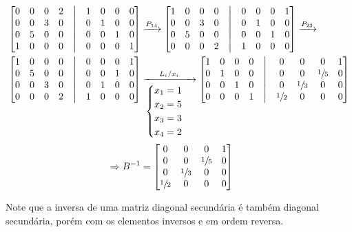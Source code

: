 \documentclass[leqno]{article}
\begin{document}
\begin{enumerate}
    \begin{align*}
        \begin{bmatrix}
        0 & 0 & 0 & 2 & \bigm| & 1 & 0 & 0 & 0\\
        0 & 0 & 3 & 0 & \bigm| & 0 & 1 & 0 & 0\\
        0 & 5 & 0 & 0 & \bigm| & 0 & 0 & 1 & 0\\
        1 & 0 & 0 & 0 & \bigm| & 0 & 0 & 0 & 1\\
        \end{bmatrix}&\xrightarrow{P_{14}}\begin{bmatrix}
        1 & 0 & 0 & 0 & \bigm| & 0 & 0 & 0 & 1\\
        0 & 0 & 3 & 0 & \bigm| & 0 & 1 & 0 & 0\\
        0 & 5 & 0 & 0 & \bigm| & 0 & 0 & 1 & 0\\
        0 & 0 & 0 & 2 & \bigm| & 1 & 0 & 0 & 0\\
        \end{bmatrix}\xrightarrow{P_{23}}\\
        \begin{bmatrix}
        1 & 0 & 0 & 0 & \bigm| & 0 & 0 & 0 & 1\\
        0 & 5 & 0 & 0 & \bigm| & 0 & 0 & 1 & 0\\
        0 & 0 & 3 & 0 & \bigm| & 0 & 1 & 0 & 0\\
        0 & 0 & 0 & 2 & \bigm| & 1 & 0 & 0 & 0\\
        \end{bmatrix}&\xrightarrow[\begin{cases}x_1=1\\x_2=5\\x_3=3\\x_4=2\\\end{cases} ]{L_i/x_i}\begin{bmatrix}
        1 & 0 & 0 & 0 & \bigm| & 0 & 0 & 0 & 1\\
        0 & 1 & 0 & 0 & \bigm| & 0 & 0 & \sfrac{1}{5} & 0\\
        0 & 0 & 1 & 0 & \bigm| & 0 & \sfrac{1}{3} & 0 & 0\\
        0 & 0 & 0 & 1 & \bigm| & \sfrac{1}{2} & 0 & 0 & 0\\
        \end{bmatrix}\\
        \Rightarrow B^{-1}&=\begin{bmatrix}
        0 & 0 & 0 & 1\\
        0 & 0 & \sfrac{1}{5} & 0\\
        0 & \sfrac{1}{3} & 0 & 0\\
        \sfrac{1}{2} & 0 & 0 & 0\\
        \end{bmatrix}
    \end{align*}
    
    Note que a inversa de uma matriz diagonal secundária é também diagonal secundária, porém com os elementos inversos e em ordem reversa. 
    
\end{enumerate}

 
\end{document}
